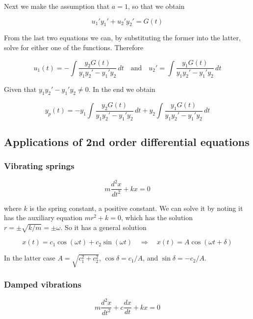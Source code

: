 \documentclass[a4paper]{article}
\begin{document}
Next we make the assumption that $a=1$, so that we obtain

\begin{equation}
    u_1'y_1'+u_2'y_2'=G(t)
\end{equation}

From the last two equations we can, by substituting the former into the latter, solve for either one of the functions. Therefore

\begin{equation}
    u_1(t)=-\int \frac{y_2G(t)}{y_1y_2'-y_1'y_2}\,dt \quad\text{and}\quad u_2'=\int \frac{y_1G(t)}{y_1y_2'-y_1'y_2}\,dt
\end{equation}

Given that $y_1y_2'-y_1'y_2\not=0$. In the end we obtain

\begin{equation}
    y_p(t)= -y_1\int \frac{y_2G(t)}{y_1y_2'-y_1'y_2}\,dt+y_2\int \frac{y_1G(t)}{y_1y_2'-y_1'y_2}\,dt
\end{equation}

\subsection{Applications of 2nd order differential equations}

\subsubsection*{Vibrating springs}
\begin{equation}
    m\frac{d^2x}{dt^2}+kx=0
\end{equation}

where $k$ is the spring constant, a positive constant. We can solve it by noting it has the auxiliary equation $mr^2+k=0$, which has the solution $r=\pm\sqrt{k/m}=\pm\omega$. So it has a general solution

\begin{equation}
    x(t)=c_1\cos(\omega t)+c_2\sin(\omega t)\quad\Rightarrow\quad x(t)=A\cos(\omega t+\delta)
\end{equation}

In the latter case $A=\sqrt{c_1^2+c_2^2}$, $\cos\delta=c_1/A$, and $\sin\delta=-c_2/A$.

\subsubsection*{Damped vibrations}
\begin{equation}
    m\frac{d^2x}{dt^2}+c\frac{dx}{dt}+kx=0
\end{equation}
\end{document}
